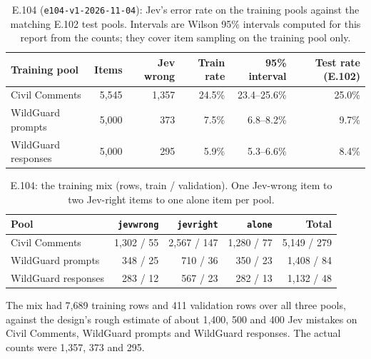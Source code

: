 \documentclass[11pt]{article}
\renewcommand{\_}{\origunderscore\allowbreak}
\begin{document}
\begin{table}[H]
\centering
\small
\caption{E.104 (\texttt{e104-v1-2026-11-04}): Jev's error rate on the training pools against the matching E.102 test pools. Intervals are Wilson 95\% intervals computed for this report from the counts; they cover item sampling on the training pool only.}
\label{tab:e104-pools}
\begin{tabular}{lrrrrr}
\toprule
Training pool & Items & Jev wrong & Train rate & 95\% interval & Test rate (E.102) \\
\midrule
Civil Comments      & 5,545 & 1,357 & 24.5\% & 23.4--25.6\% & 25.0\% \\
WildGuard prompts   & 5,000 &   373 &  7.5\% &  6.8--8.2\%  &  9.7\% \\
WildGuard responses & 5,000 &   295 &  5.9\% &  5.3--6.6\%  &  8.4\% \\
\bottomrule
\end{tabular}
\end{table}

\begin{table}[H]
\centering
\small
\caption{E.104: the training mix (rows, train / validation). One Jev-wrong item to two Jev-right items to one alone item per pool.}
\label{tab:e104-mix}
\begin{tabular}{lrrrr}
\toprule
Pool & \texttt{jev\_wrong} & \texttt{jev\_right} & \texttt{alone} & Total \\
\midrule
Civil Comments      & 1,302 / 55 & 2,567 / 147 & 1,280 / 77 & 5,149 / 279 \\
WildGuard prompts   &   348 / 25 &   710 / 36  &   350 / 23 & 1,408 / 84 \\
WildGuard responses &   283 / 12 &   567 / 23  &   282 / 13 & 1,132 / 48 \\
\bottomrule
\end{tabular}
\end{table}

The mix had 7,689 training rows and 411 validation rows over all three pools, against the design's rough estimate of about 1,400, 500 and 400 Jev mistakes on Civil Comments, WildGuard prompts and WildGuard responses. The actual counts were 1,357, 373 and 295.
\end{document}
